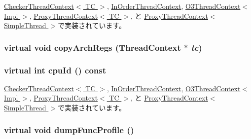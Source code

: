 \hyperlink{classCheckerThreadContext_a651d5d14e7a4e95ebe6d7f5b8ee5a107}{CheckerThreadContext$<$ TC $>$}, \hyperlink{classInOrderThreadContext_a651d5d14e7a4e95ebe6d7f5b8ee5a107}{InOrderThreadContext}, \hyperlink{classO3ThreadContext_a6112c7e72d0367debf95bc85bd28b31a}{O3ThreadContext$<$ Impl $>$}, \hyperlink{classProxyThreadContext_a651d5d14e7a4e95ebe6d7f5b8ee5a107}{ProxyThreadContext$<$ TC $>$}, と \hyperlink{classProxyThreadContext_a651d5d14e7a4e95ebe6d7f5b8ee5a107}{ProxyThreadContext$<$ SimpleThread $>$}で実装されています。\hypertarget{classThreadContext_a60461cf605ce8cbd4b61268e9031168d}{
\subsubsection[{copyArchRegs}]{\setlength{\rightskip}{0pt plus 5cm}virtual void copyArchRegs ({\bf ThreadContext} $\ast$ {\em tc})}}
\label{classThreadContext_a60461cf605ce8cbd4b61268e9031168d}
\hypertarget{classThreadContext_a7272bc1f752a9f60ab0358a09cc96f97}{
\subsubsection[{cpuId}]{\setlength{\rightskip}{0pt plus 5cm}virtual int cpuId () const}}
\label{classThreadContext_a7272bc1f752a9f60ab0358a09cc96f97}


\hyperlink{classCheckerThreadContext_a1e2d18ebf4e21f2416c21a8b072e2c7b}{CheckerThreadContext$<$ TC $>$}, \hyperlink{classInOrderThreadContext_a1e2d18ebf4e21f2416c21a8b072e2c7b}{InOrderThreadContext}, \hyperlink{classO3ThreadContext_a380902de24674abc2125ffb1adc81528}{O3ThreadContext$<$ Impl $>$}, \hyperlink{classProxyThreadContext_a1e2d18ebf4e21f2416c21a8b072e2c7b}{ProxyThreadContext$<$ TC $>$}, と \hyperlink{classProxyThreadContext_a1e2d18ebf4e21f2416c21a8b072e2c7b}{ProxyThreadContext$<$ SimpleThread $>$}で実装されています。\hypertarget{classThreadContext_ae3f0b63a85470c17e675083487febead}{
\subsubsection[{dumpFuncProfile}]{\setlength{\rightskip}{0pt plus 5cm}virtual void dumpFuncProfile ()}}
\label{classThreadContext_ae3f0b63a85470c17e675083487febead}


